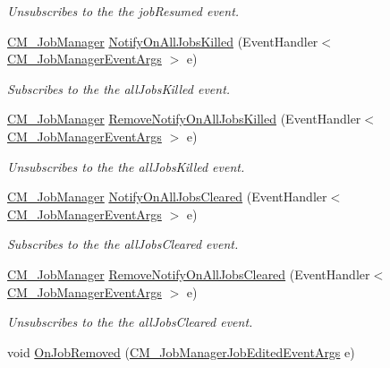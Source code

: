 \begin{DoxyCompactItemize}
\begin{DoxyCompactList}\small\item\em Unsubscribes to the the job\+Resumed event. \end{DoxyCompactList}\item 
\hyperlink{class_c_m___job_manager}{C\+M\+\_\+\+Job\+Manager} \hyperlink{class_c_m___job_manager_a047fad74154dfb0dfd95b2e68c241c53}{Notify\+On\+All\+Jobs\+Killed} (Event\+Handler$<$ \hyperlink{class_c_m___job_manager_event_args}{C\+M\+\_\+\+Job\+Manager\+Event\+Args} $>$ e)
\begin{DoxyCompactList}\small\item\em Subscribes to the the all\+Jobs\+Killed event. \end{DoxyCompactList}\item 
\hyperlink{class_c_m___job_manager}{C\+M\+\_\+\+Job\+Manager} \hyperlink{class_c_m___job_manager_a86d91437f2588d7f218ced31689bfbcd}{Remove\+Notify\+On\+All\+Jobs\+Killed} (Event\+Handler$<$ \hyperlink{class_c_m___job_manager_event_args}{C\+M\+\_\+\+Job\+Manager\+Event\+Args} $>$ e)
\begin{DoxyCompactList}\small\item\em Unsubscribes to the the all\+Jobs\+Killed event. \end{DoxyCompactList}\item 
\hyperlink{class_c_m___job_manager}{C\+M\+\_\+\+Job\+Manager} \hyperlink{class_c_m___job_manager_a61b1d9a2f93539f35a65bc52f35a2a7d}{Notify\+On\+All\+Jobs\+Cleared} (Event\+Handler$<$ \hyperlink{class_c_m___job_manager_event_args}{C\+M\+\_\+\+Job\+Manager\+Event\+Args} $>$ e)
\begin{DoxyCompactList}\small\item\em Subscribes to the the all\+Jobs\+Cleared event. \end{DoxyCompactList}\item 
\hyperlink{class_c_m___job_manager}{C\+M\+\_\+\+Job\+Manager} \hyperlink{class_c_m___job_manager_addf2ff8338d0cef43d47c8f0c95ec7c1}{Remove\+Notify\+On\+All\+Jobs\+Cleared} (Event\+Handler$<$ \hyperlink{class_c_m___job_manager_event_args}{C\+M\+\_\+\+Job\+Manager\+Event\+Args} $>$ e)
\begin{DoxyCompactList}\small\item\em Unsubscribes to the the all\+Jobs\+Cleared event. \end{DoxyCompactList}\item 
void \hyperlink{class_c_m___job_manager_a26be7a4d45e34639bde44ec8c7a7dac4}{On\+Job\+Removed} (\hyperlink{class_c_m___job_manager_job_edited_event_args}{C\+M\+\_\+\+Job\+Manager\+Job\+Edited\+Event\+Args} e)

\end{DoxyCompactItemize}
